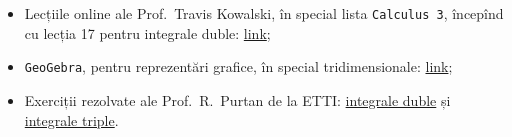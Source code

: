 \begin{itemize}
    \item Lecțiile online ale Prof.\ Travis Kowalski, în special lista
        \texttt{Calculus 3}, începînd cu lecția 17 pentru integrale duble:
        \href{https://www.youtube.com/watch?v=le1JlwBkAog&list=PLE7F8F33E161D1425&index=23}{link};
    \item \texttt{GeoGebra}, pentru reprezentări grafice, în special
        tridimensionale: \href{https://www.geogebra.org/3d?lang=en}{link};
    \item Exerciții rezolvate ale Prof.\ R.\ Purtan de la ETTI:
        \href{https://adrianmanea.xyz/docs/18-19-etti-am1/purtan-int-duble.pdf}{integrale duble}
        și \href{https://adrianmanea.xyz/docs/18-19-etti-am1/purtan-int-triple.pdf}{integrale triple}.
\end{itemize}


